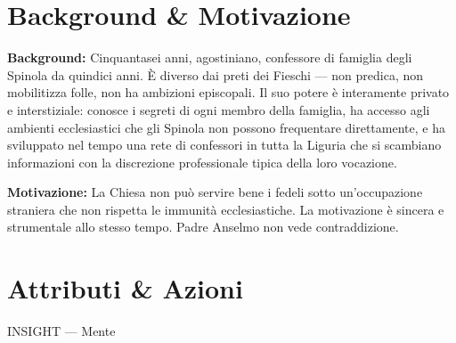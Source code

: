 
\clearpage


\section*{Background \& Motivazione}

\begin{rulebox}{}
  \textbf{Background:} Cinquantasei anni, agostiniano, confessore di famiglia degli
  Spinola da quindici anni. È diverso dai preti dei Fieschi — non predica, non
  mobilitizza folle, non ha ambizioni episcopali. Il suo potere è interamente
  privato e interstiziale: conosce i segreti di ogni membro della famiglia,
  ha accesso agli ambienti ecclesiastici che gli Spinola non possono frequentare
  direttamente, e ha sviluppato nel tempo una rete di confessori in tutta la
  Liguria che si scambiano informazioni con la discrezione professionale
  tipica della loro vocazione.

  \medskip\noindent\textcolor{SpinolaRed}{\textbf{Motivazione:}} La Chiesa non può
  servire bene i fedeli sotto un'occupazione straniera che non rispetta le
  immunità ecclesiastiche. La motivazione è sincera e strumentale allo stesso tempo.
  Padre Anselmo non vede contraddizione.
\end{rulebox}

\section*{Attributi \& Azioni}


\begin{attributoblock}[SpinolaRed]{INSIGHT — Mente}
\end{attributoblock}


